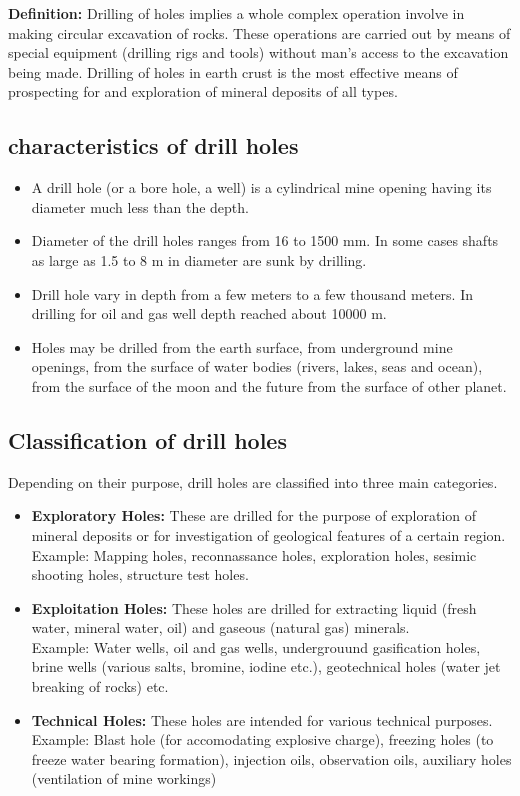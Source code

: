 \documentclass{article}
\begin{document}
\begin{multicols}{2}
  \textbf{Definition:} Drilling of holes implies a whole complex operation involve in making circular excavation of rocks. These operations are carried out by means of special equipment (drilling rigs and tools) without man's access to the excavation being made. Drilling of holes in earth crust is the most effective means of prospecting for and exploration of mineral deposits of all types. \\

  \subsection*{characteristics of drill holes}
  \begin{itemize}
    \item A drill hole (or a bore hole, a well) is a cylindrical mine opening having its diameter much less than the depth. 
    \item Diameter of the drill holes ranges from 16 to 1500 mm. In some cases shafts as large as 1.5 to 8 m in diameter are sunk by drilling.
    \item Drill hole vary in depth from a few meters to a few thousand meters. In drilling for oil and gas well depth reached about 10000 m.
    \item Holes may be drilled from the earth surface, from underground mine openings, from the surface of water bodies (rivers, lakes, seas and ocean), from the surface of the moon and the future from the surface of other planet.  
  \end{itemize}

  \subsection*{Classification of drill holes}
  Depending on their purpose, drill holes are classified into three main categories.
  \begin{itemize}
    \item \textbf{Exploratory Holes:} These are drilled for the purpose of exploration of mineral deposits or for investigation of geological features of a certain region.\\ Example: Mapping holes, reconnassance holes, exploration holes, sesimic shooting holes, structure test holes.
    \item \textbf{Exploitation Holes:} These holes are drilled for extracting liquid (fresh water, mineral water, oil) and gaseous (natural gas) minerals.\\Example: Water wells, oil and gas wells, undergrouund gasification holes, brine wells (various salts, bromine, iodine etc.), geotechnical holes (water jet breaking of rocks) etc.
    \item \textbf{Technical Holes:} These holes are intended for various technical purposes. \\Example: Blast hole (for accomodating explosive charge), freezing holes (to freeze water bearing formation), injection oils, observation oils, auxiliary holes (ventilation of mine workings)
  \end{itemize}


\end{multicols}
\end{document}
